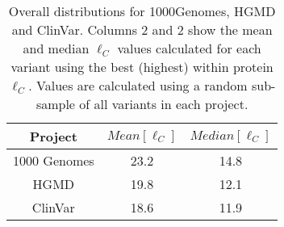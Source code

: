 \begin{table}[ht]
\begin{tabular}{|c|c|c|}
\hline 
Project      & $Mean[\ell_C]$  &  $Median[\ell_C]$ \\
\hline 
1000 Genomes &            23.2 &          14.8  \\
HGMD         &            19.8 &          12.1  \\
ClinVar      &            18.6 &          11.9  \\
\hline 
\end{tabular} 
\caption{Overall distributions for 1000Genomes, HGMD and ClinVar. Columns 2 and 2 show the mean and median $\ell_C$ values calculated for each variant using the best (highest) within protein $\ell_C$. Values are calculated using a random sub-sample of all variants in each project.}
\label{tab:gwas_1Kg}
\end{table}
